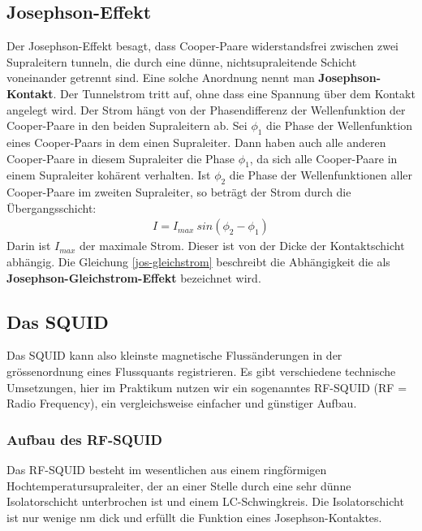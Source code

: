 \documentclass[12pt]{article}
\begin{document}
\subsection{Josephson-Effekt}
\label{josephson}

Der Josephson-Effekt besagt, dass Cooper-Paare widerstandsfrei zwischen zwei Supraleitern tunneln, die durch eine dünne, nichtsupraleitende Schicht voneinander getrennt sind. Eine solche Anordnung nennt man \textbf{Josephson-Kontakt}. Der Tunnelstrom tritt auf, ohne dass eine Spannung über dem Kontakt angelegt wird. Der Strom hängt von der Phasendifferenz der Wellenfunktion der Cooper-Paare in den beiden Supraleitern ab. Sei $\phi_1$ die Phase der Wellenfunktion eines Cooper-Paars in dem einen Supraleiter. Dann haben auch alle anderen Cooper-Paare in diesem Supraleiter die Phase $\phi_1$, da sich alle Cooper-Paare in einem Supraleiter kohärent verhalten. Ist $\phi_2$ die Phase der Wellenfunktionen aller Cooper-Paare im zweiten Supraleiter, so beträgt der Strom durch die Übergangsschicht:
\begin{align}
\label{jos-gleichstrom}
 I = I_{max}~sin(\phi_2 - \phi_1)
\end{align}
Darin ist $I_{max}$ der maximale Strom. Dieser ist von der Dicke der Kontaktschicht abhängig. Die Gleichung \ref{jos-gleichstrom} beschreibt die Abhängigkeit die als \textbf{Josephson-Gleichstrom-Effekt} bezeichnet wird.


\subsection{Das SQUID}

Das SQUID kann also kleinste magnetische Flussänderungen in der grössenordnung eines Flussquants registrieren. Es gibt verschiedene technische Umsetzungen, hier im Praktikum  nutzen wir ein sogenanntes RF-SQUID (RF = Radio Frequency),  ein vergleichsweise einfacher und günstiger Aufbau.

\subsubsection{Aufbau des RF-SQUID}

Das RF-SQUID besteht im wesentlichen aus einem ringförmigen Hochtemperatursupraleiter, der an einer Stelle durch eine sehr dünne Isolatorschicht unterbrochen ist und einem LC-Schwingkreis. Die Isolatorschicht ist nur wenige nm dick  und erfüllt die Funktion eines Josephson-Kontaktes.
\end{document}
